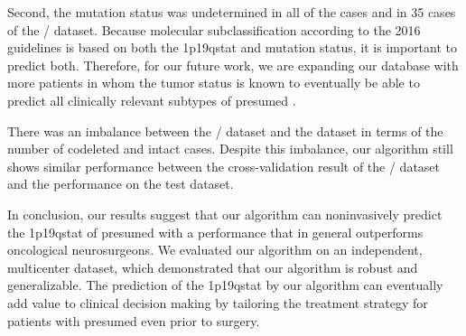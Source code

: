 Second, the  mutation status was undetermined in all of the  cases and in 35 cases of the / dataset.
Because molecular subclassification according to the  2016 guidelines is based on both the \acl{1p19qstat} and  mutation status, it is important to predict both.
Therefore, for our future work, we are expanding our database with more patients in whom the tumor  status is known to eventually be able to predict all clinically relevant subtypes of presumed .

There was an imbalance between the / dataset and the  dataset in terms of the number of codeleted and intact cases.
Despite this imbalance, our algorithm still shows similar performance between the cross-validation result of the / dataset and the performance on the  test dataset.

In conclusion, our results suggest that our algorithm can noninvasively predict the \acl{1p19qstat} of presumed  with a performance that in general outperforms oncological neurosurgeons.
We evaluated our algorithm on an independent, multicenter dataset, which demonstrated that our algorithm is robust and generalizable.
The prediction of the \acl{1p19qstat} by our algorithm can eventually add value to clinical decision making by tailoring the treatment strategy for patients with presumed  even prior to surgery.


